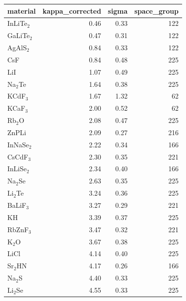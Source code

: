 \begin{table}[ht]
  \centering
  \selectfont
\begin{tabular}{lrrr}
\toprule
     material &  kappa\_corrected &      sigma &  space\_group \\
\midrule
 InLiTe$_2$ &             0.46 &       0.33 &          122 \\
 GaLiTe$_2$ &             0.47 &       0.31 &          122 \\
  AgAlS$_2$ &             0.84 &       0.33 &          122 \\
        CsF &             0.84 &       0.48 &          225 \\
        LiI &             1.07 &       0.49 &          225 \\
   Na$_2$Te &             1.64 &       0.38 &          225 \\
   KCdF$_3$ &             1.67 &       1.32 &           62 \\
   KCaF$_3$ &             2.00 &       0.52 &           62 \\
    Rb$_2$O &             2.08 &       0.47 &          225 \\
      ZnPLi &             2.09 &       0.27 &          216 \\
 InNaSe$_2$ &             2.22 &       0.34 &          166 \\
  CsCdF$_3$ &             2.30 &       0.35 &          221 \\
 InLiSe$_2$ &             2.34 &       0.40 &          166 \\
   Na$_2$Se &             2.63 &       0.35 &          225 \\
   Li$_2$Te &             3.24 &       0.36 &          225 \\
  BaLiF$_3$ &             3.27 &       0.29 &          221 \\
         KH &             3.39 &       0.37 &          225 \\
  RbZnF$_3$ &             3.47 &       0.32 &          221 \\
     K$_2$O &             3.67 &       0.38 &          225 \\
       LiCl &             4.14 &       0.40 &          225 \\
   Sr$_2$HN &             4.17 &       0.26 &          166 \\
    Na$_2$S &             4.40 &       0.33 &          225 \\
   Li$_2$Se &             4.55 &       0.33 &          225 \\

\end{tabular}
\end{table}
